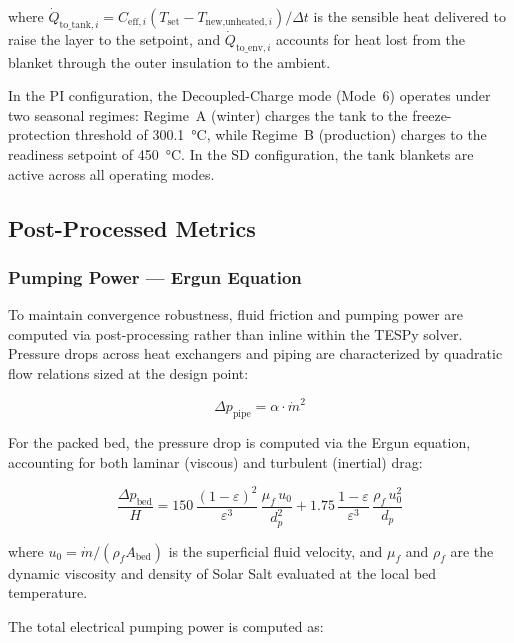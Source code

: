 \documentclass[11pt,review,3p]{elsarticle}
\begin{document}
where $\dot{Q}_{\text{to\_tank},i} = C_{\text{eff},i} (T_{\text{set}} - T_{\text{new,unheated},i}) / \Delta t$ is the sensible heat delivered to raise the layer to the setpoint, and $\dot{Q}_{\text{to\_env},i}$ accounts for heat lost from the blanket through the outer insulation to the ambient.

In the PI configuration, the Decoupled-Charge mode (Mode~6) operates under two seasonal regimes: Regime~A (winter) charges the tank to the freeze-protection threshold of \SI{300.1}{\celsius}, while Regime~B (production) charges to the readiness setpoint of \SI{450}{\celsius}. In the SD configuration, the tank blankets are active across all operating modes.

\subsection{Post-Processed Metrics}
\label{sec:postprocess}

\subsubsection{Pumping Power --- Ergun Equation}
\label{sec:ergun}

To maintain convergence robustness, fluid friction and pumping power are computed via post-processing rather than inline within the TESPy solver. Pressure drops across heat exchangers and piping are characterized by quadratic flow relations sized at the design point:

\begin{equation}
    \Delta p_{\text{pipe}} = \alpha \cdot \dot{m}^{2}
    \label{eq:pipe_dp}
\end{equation}

For the packed bed, the pressure drop is computed via the Ergun equation, accounting for both laminar (viscous) and turbulent (inertial) drag:

\begin{equation}
    \frac{\Delta p_{\text{bed}}}{H} = 150\,\frac{(1 - \varepsilon)^{2}}{\varepsilon^{3}}\,\frac{\mu_f\,u_0}{d_p^{2}} + 1.75\,\frac{1 - \varepsilon}{\varepsilon^{3}}\,\frac{\rho_f\,u_0^{2}}{d_p}
    \label{eq:ergun}
\end{equation}

where $u_0 = \dot{m} / (\rho_f A_{\text{bed}})$ is the superficial fluid velocity, and $\mu_f$ and $\rho_f$ are the dynamic viscosity and density of Solar Salt evaluated at the local bed temperature.

The total electrical pumping power is computed as:
\end{document}
